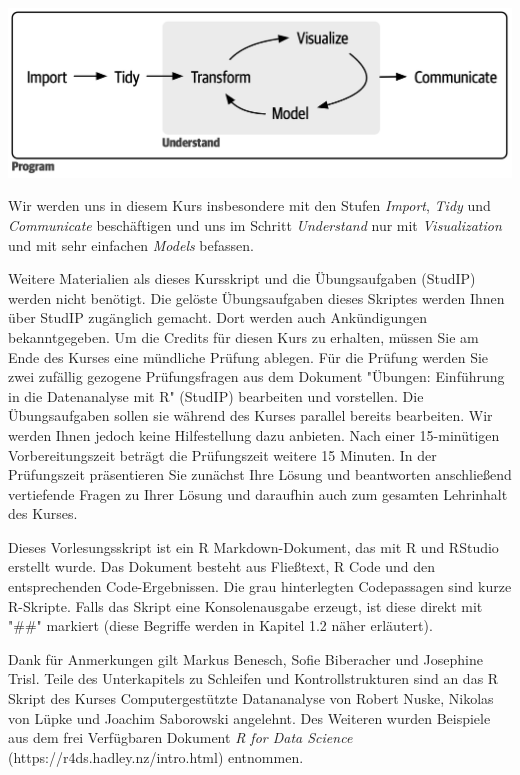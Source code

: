 \begin{titlepage}
\includegraphics{img/data_science_steps.png}

Wir werden uns in diesem Kurs insbesondere mit den Stufen \textit{Import}, \textit{Tidy} und \textit{Communicate} beschäftigen und uns im Schritt \textit{Understand} nur mit \textit{Visualization} und mit sehr einfachen \textit{Models} befassen.

Weitere Materialien als dieses Kursskript und die Übungsaufgaben (StudIP) werden nicht benötigt. Die gelöste Übungsaufgaben dieses Skriptes werden Ihnen über StudIP zugänglich gemacht. Dort werden auch Ankündigungen bekanntgegeben. Um die Credits für diesen Kurs zu erhalten, müssen Sie am Ende des Kurses eine mündliche Prüfung ablegen. Für die Prüfung werden Sie zwei zufällig gezogene Prüfungsfragen aus dem Dokument "Übungen: Einführung in die Datenanalyse mit R" (StudIP) bearbeiten und vorstellen. Die Übungsaufgaben sollen sie während des Kurses parallel bereits bearbeiten. Wir werden Ihnen jedoch keine Hilfestellung dazu anbieten. Nach einer 15-minütigen Vorbereitungszeit beträgt die Prüfungszeit weitere 15 Minuten. In der Prüfungszeit präsentieren Sie zunächst Ihre Lösung und beantworten anschließend vertiefende Fragen zu Ihrer Lösung und daraufhin auch zum gesamten Lehrinhalt des Kurses.

Dieses Vorlesungsskript ist ein R Markdown-Dokument, das mit R und RStudio erstellt wurde. Das Dokument besteht aus Fließtext, R Code und den entsprechenden Code-Ergebnissen. Die grau hinterlegten Codepassagen sind kurze R-Skripte. Falls das Skript eine Konsolenausgabe erzeugt, ist diese direkt mit "\#\#" markiert (diese Begriffe werden in Kapitel 1.2 näher erläutert).

Dank für Anmerkungen gilt Markus Benesch, Sofie Biberacher und Josephine Trisl. Teile des Unterkapitels zu Schleifen und Kontrollstrukturen sind an das R Skript des Kurses Computergestützte Datananalyse von Robert Nuske, Nikolas von Lüpke und Joachim Saborowski angelehnt. Des Weiteren wurden Beispiele aus dem frei Verfügbaren Dokument \textit{R for Data Science} (https://r4ds.hadley.nz/intro.html) entnommen.
\end{titlepage}

